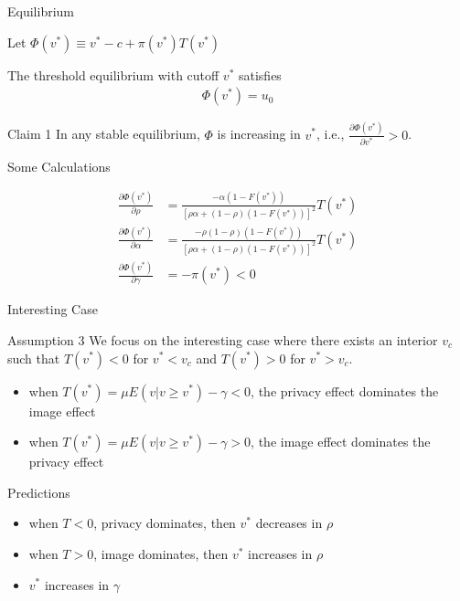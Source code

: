 \documentclass[11pt,aspectratio=169]{beamer}
\begin{document}
\begin{frame}{Equilibrium}

Let $\Phi(v^*)\equiv v^* - c + \pi(v^*)T(v^*)$
\vspace{1em}

The threshold equilibrium with cutoff $v^*$ satisfies
\begin{align*}
    \Phi(v^*) = u_0
\end{align*}

\begin{exampleblock}{Claim 1}
    In any stable equilibrium, $\Phi$ is increasing in $v^*$, i.e., $\frac{\partial \Phi(v^*)}{\partial v^*}>0$. 
\end{exampleblock}
\end{frame}

\begin{frame}{Some Calculations}

\begin{align*}
    \frac{\partial \Phi(v^*)}{\partial \rho} &= \frac{-\alpha(1-F(v^*))}{[\rho\alpha+(1-\rho)(1-F(v^*))]^2}T(v^*)\\[10pt]
    \frac{\partial \Phi(v^*)}{\partial \alpha} &= \frac{-\rho(1-\rho)(1-F(v^*))}{[\rho\alpha+(1-\rho)(1-F(v^*))]^2}T(v^*)\\[10pt]
    \frac{\partial \Phi(v^*)}{\partial \gamma} &= -\pi(v^*)<0
\end{align*}
\end{frame}

\begin{frame}{Interesting Case}
\begin{exampleblock}{Assumption 3}
    We focus on the interesting case where there exists an interior $v_c$ such that $T(v^*)<0$ for $v^*<v_c$ and $T(v^*)>0$ for $v^*>v_c$.
\end{exampleblock}
\vspace{2em}

\begin{itemize}
    \item when $T(v^*) = \mu E(v|v\geq v^*)-\gamma<0$, the privacy effect dominates the image effect
    \item when $T(v^*) = \mu E(v|v\geq v^*)-\gamma>0$, the image effect dominates the privacy effect
\end{itemize}
\end{frame}

\begin{frame}{Predictions}

\begin{itemize}
    \item when $T<0$, privacy dominates, then $v^*$ decreases in $\rho$
    \item when $T>0$, image dominates, then $v^*$ increases in $\rho$
    \item $v^*$ increases in $\gamma$
\end{itemize}





\end{frame}
\end{document}
